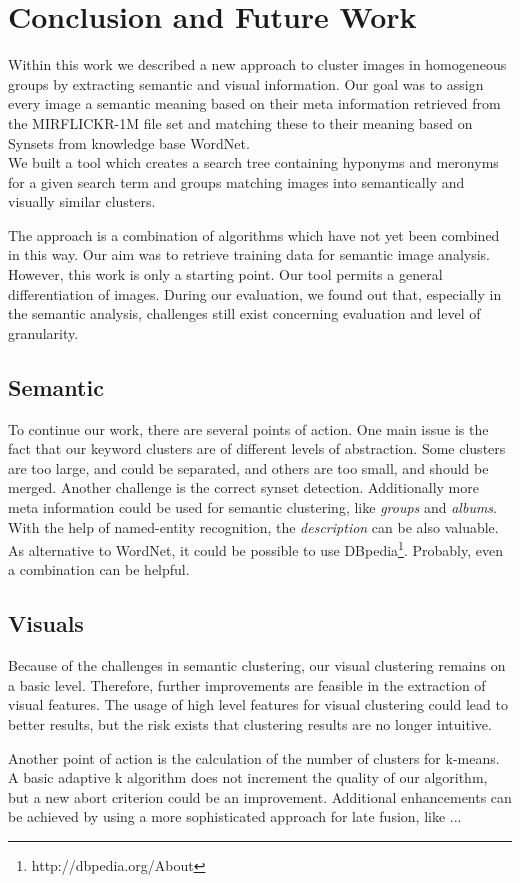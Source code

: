 %
\section{Conclusion and Future Work}
\label{sec_future}

Within this work we described a new approach to cluster images in homogeneous groups by extracting semantic and visual information. Our goal was to assign every image a semantic meaning based on their meta information retrieved from the MIRFLICKR-1M file set and matching these to their meaning based on Synsets from knowledge base WordNet.
\\ We built a tool which creates a search tree containing hyponyms and meronyms for a given search term and groups matching images into semantically and visually similar clusters.

\bigskip
The approach is a combination of algorithms which have not yet been combined in this way. Our aim was to retrieve training data for semantic image analysis. However, this work is only a starting point. Our tool permits a general differentiation of images. During our evaluation, we found out that, especially in the semantic analysis, challenges still exist concerning evaluation and level of granularity.

\subsection{Semantic}
To continue our work, there are several points of action. One main issue is the fact that our keyword clusters are of different levels of abstraction. Some clusters are too large, and could be separated, and others are too small, and should be merged. Another challenge is the correct synset detection. Additionally more meta information could be used for semantic clustering, like \emph{groups} and \emph{albums}. With the help of named-entity recognition, the \emph{description} can be also valuable. As alternative to WordNet, it could be possible to use DBpedia\footnote{http://dbpedia.org/About}. Probably, even a combination can be helpful.


\subsection{Visuals}

Because of the challenges in semantic clustering, our visual clustering remains on a basic level. Therefore, further improvements are feasible in the extraction of visual features. The usage of high level features for visual clustering could lead to better results, but the risk exists that clustering results are no longer intuitive. 

Another point of action is the calculation of the number of clusters for k-means. A basic adaptive k algorithm does not increment the quality of our algorithm, but a new abort criterion could be an improvement. Additional enhancements can be achieved by using a more sophisticated approach for late fusion, like ...  
